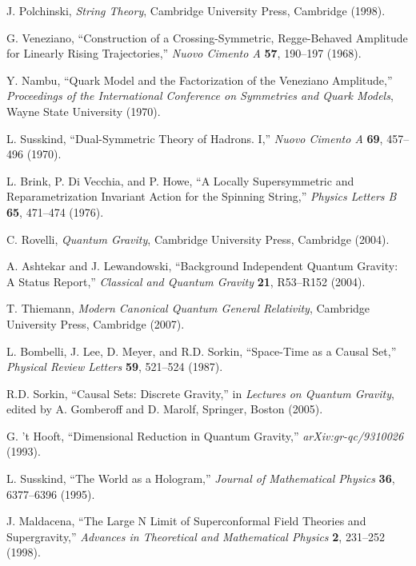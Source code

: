 \documentclass[12pt,a4paper]{article}
\begin{document}
\begin{thebibliography}{99}
 J. Polchinski, \emph{String Theory}, Cambridge University Press, Cambridge (1998).

 G. Veneziano, ``Construction of a Crossing-Symmetric, Regge-Behaved Amplitude for Linearly Rising Trajectories,'' \emph{Nuovo Cimento A} \textbf{57}, 190--197 (1968).

 Y. Nambu, ``Quark Model and the Factorization of the Veneziano Amplitude,'' \emph{Proceedings of the International Conference on Symmetries and Quark Models}, Wayne State University (1970).

 L. Susskind, ``Dual-Symmetric Theory of Hadrons. I,'' \emph{Nuovo Cimento A} \textbf{69}, 457--496 (1970).

 L. Brink, P. Di Vecchia, and P. Howe, ``A Locally Supersymmetric and Reparametrization Invariant Action for the Spinning String,'' \emph{Physics Letters B} \textbf{65}, 471--474 (1976).

 C. Rovelli, \emph{Quantum Gravity}, Cambridge University Press, Cambridge (2004).

 A. Ashtekar and J. Lewandowski, ``Background Independent Quantum Gravity: A Status Report,'' \emph{Classical and Quantum Gravity} \textbf{21}, R53--R152 (2004).

 T. Thiemann, \emph{Modern Canonical Quantum General Relativity}, Cambridge University Press, Cambridge (2007).

 L. Bombelli, J. Lee, D. Meyer, and R.D. Sorkin, ``Space-Time as a Causal Set,'' \emph{Physical Review Letters} \textbf{59}, 521--524 (1987).

 R.D. Sorkin, ``Causal Sets: Discrete Gravity,'' in \emph{Lectures on Quantum Gravity}, edited by A. Gomberoff and D. Marolf, Springer, Boston (2005).

 G. 't Hooft, ``Dimensional Reduction in Quantum Gravity,'' \emph{arXiv:gr-qc/9310026} (1993).

 L. Susskind, ``The World as a Hologram,'' \emph{Journal of Mathematical Physics} \textbf{36}, 6377--6396 (1995).

 J. Maldacena, ``The Large N Limit of Superconformal Field Theories and Supergravity,'' \emph{Advances in Theoretical and Mathematical Physics} \textbf{2}, 231--252 (1998).


\end{thebibliography}
\end{document}
